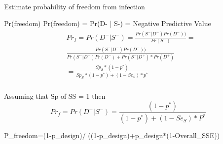 \documentclass[
  ignorenonframetext,
]{beamer}
\newenvironment{Shaded}{\begin{snugshade}}{\end{snugshade}}
\newcommand{\DecValTok}[1]{\textcolor[rgb]{0.00,0.00,0.81}{#1}}
\newcommand{\NormalTok}[1]{#1}
\newcommand{\OtherTok}[1]{\textcolor[rgb]{0.56,0.35,0.01}{#1}}
\newcommand{\SpecialCharTok}[1]{\textcolor[rgb]{0.00,0.00,0.00}{#1}}
\begin{document}
\begin{frame}[fragile]{Estimate probability of freedom from infection}
\protect\hypertarget{estimate-probability-of-freedom-from-infection}{}
\begin{block}{Pr(freedom)}
  Pr(freedom) = Pr(D- | S-) = Negative Predictive Value
  \begin{equation}
  \begin{aligned}
  \begin{split}
  &Pr_f = Pr(D^- | S^-) = \frac{Pr(S^- | D^-) Pr(D^-))}{Pr(S^-)} =\\
  &\frac{Pr(S^- | D^-) Pr(D^-) )}{Pr(S^- | D^-) Pr(D^-) + Pr(S^-|D^+)*Pr(D^+)}\\ 
  &= \frac{Sp_S * (1-p^*)}{Sp_S * (1-p^*) + (1 - Se_S)*p^*}\\
  \end{split}
  \end{aligned}
  \end{equation}

\end{block}

\begin{block}{Assuming that Sp of SS = 1 then}
  \begin{equation}
        Pr_f = Pr(D^- | S^-) = \frac{(1-p^*)}{(1-p^*) + (1 - Se_S)*P^*}
  \end{equation}

\end{block}

\begin{Shaded}
\begin{Highlighting}[]
\NormalTok{P\_freedom}\OtherTok{=}\NormalTok{(}\DecValTok{1}\SpecialCharTok{{-}}\NormalTok{p\_design)}\SpecialCharTok{/}
\NormalTok{  ((}\DecValTok{1}\SpecialCharTok{{-}}\NormalTok{p\_design)}\SpecialCharTok{+}\NormalTok{p\_design}\SpecialCharTok{*}\NormalTok{(}\DecValTok{1}\SpecialCharTok{{-}}\NormalTok{Overall\_SSE))}
\end{Highlighting}
\end{Shaded}
\end{frame}
\end{document}
